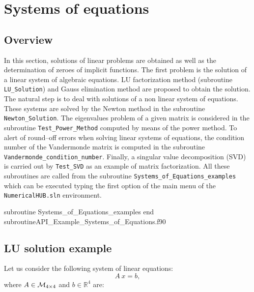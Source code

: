 
    
    \chapter{Systems of equations}
    \label{User:Linear_Algebra}
    
    \vspace*{-1cm} 
    \section{Overview} 
    
    In this section, solutions of linear problems are obtained as well as the determination of zeroes of implicit functions. The first 
    problem is the solution of a linear system of algebraic equations. LU factorization method (subroutine \verb|LU_Solution|) and Gauss 
    elimination method are proposed to obtain the solution.  The natural step is to deal with solutions of a non linear system of equations. 
    These systems are solved by the Newton method in the subroutine \verb|Newton_Solution|. The eigenvalues problem of a given matrix is 
    considered in the subroutine \verb|Test_Power_Method| computed by means of the power method. 
    To alert of round--off errors when solving linear systems of equations,
    the condition number of the Vandermonde matrix is computed in the subroutine 
    \verb|Vandermonde_condition_number|.
    Finally, a singular value decomposition (SVD) is carried out by 
    \verb|Test_SVD| as an example of matrix factorization. 
     All these subroutines are called from the subroutine \verb|Systems_of_Equations_examples| which can 
    be executed typing the first option of the main menu of the \verb|NumericalHUB.sln| environment. 
    
    
    
    \vspace{0.2cm} 
             {subroutine Systems_of_Equations_examples}
             {end subroutine}{API_Example_Systems_of_Equations.f90}
  
\section{LU solution example}
    Let us consider the following system of linear equations:  
    \begin{equation*}
    	A \ x = b ,
    \end{equation*}
    where $A \in {\cal M}_{4 \times 4} $ and $b \in  \mathbb{R}^4$  are:
    
